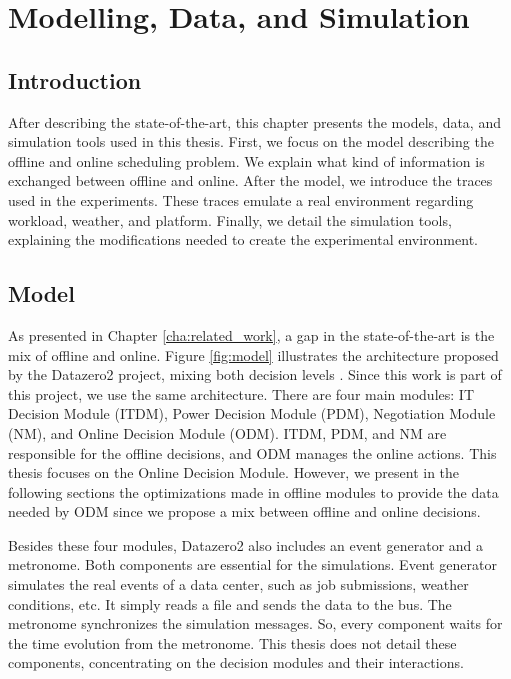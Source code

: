 \chapter{Modelling, Data, and Simulation}
\label{cha:model}

\minitoc

\section{Introduction}

After describing the state-of-the-art, this chapter presents the models, data, and simulation tools used in this thesis. First, we focus on the model describing the offline and online scheduling problem. We explain what kind of information is exchanged between offline and online. After the model, we introduce the traces used in the experiments. These traces emulate a real environment regarding workload, weather, and platform. Finally, we detail the simulation tools, explaining the modifications needed to create the experimental environment.

\section{Model}

As presented in Chapter \ref{cha:related_work}, a gap in the state-of-the-art is the mix of offline and online. Figure \ref{fig:model} illustrates the architecture proposed by the Datazero2 project, mixing both decision levels \cite{Datazero}. Since this work is part of this project, we use the same architecture. There are four main modules: IT Decision Module (ITDM), Power Decision Module (PDM), Negotiation Module (NM), and Online Decision Module (ODM). ITDM, PDM, and NM are responsible for the offline decisions, and ODM manages the online actions. This thesis focuses on the Online Decision Module. However, we present in the following sections the optimizations made in offline modules to provide the data needed by ODM since we propose a mix between offline and online decisions.

Besides these four modules, Datazero2 also includes an event generator and a metronome. Both components are essential for the simulations. Event generator simulates the real events of a data center, such as job submissions, weather conditions, etc. It simply reads a file and sends the data to the bus. The metronome synchronizes the simulation messages. So, every component waits for the time evolution from the metronome. This thesis does not detail these components, concentrating on the decision modules and their interactions.

